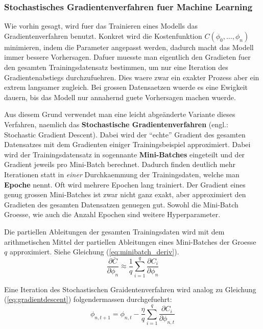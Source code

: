 \documentclass[../main]{subfiles}
\begin{document}
\subsubsection{Stochastisches Gradientenverfahren fuer Machine Learning}
Wie vorhin gesagt, wird fuer das Trainieren eines Modells das Gradientenverfahren benutzt.
Konkret wird die Kostenfunktion $C(\phi_0,\ldots,\phi_n)$ minimieren, indem die Parameter angepasst werden, dadurch macht das Modell immer bessere Vorhersagen.
Dafuer muesste man eigentlich den Gradieten fuer den gesamten Trainingsdatensatz bestimmen, um nur eine Iteration des Gradientenabstiegs durchzufuehren.
Dies waere zwar ein exakter Prozess aber ein extrem langsamer zugleich.
Bei grossen Datensaetzen wuerde es eine Ewigkeit dauern, bis das Modell nur annahernd guete Vorhersagen machen wuerde.
\par\medskip
Aus diesem Grund verwendet man eine leicht abgeänderte Variante dieses Verfahren, naemlich das \textbf{Stochastische Gradientenverfahren} (engl.: Stochastic Gradient Descent).
Dabei wird der ``echte'' Gradient des gesamten Datensatzes mit dem Gradienten einiger Trainingsbeispiel approximiert.
Dabei wird der Trainingsdatensatz in sogennante \textbf{Mini-Batches} eingeteilt und der Gradient jeweils pro Mini-Batch berechnet.
Dadurch finden deutlich mehr Iterationen statt in \textit{einer} Durchkaemmung der Trainingsdaten, welche man \textbf{Epoche} nennt. Oft wird mehrere Epochen lang trainiert.
Der Gradient eines genug grossen Mini-Batches ist zwar nicht ganz exakt, aber approximiert den Gradieten des gesamten Datensatzen genuegen gut.
Sowohl die Mini-Batch Groesse, wie auch die Anzahl Epochen sind weitere Hyperparameter.
\par\medskip
Die partiellen Ableitungen der gesamten Trainingsdaten wird mit dem arithmetischen Mittel der partiellen Ableitungen eines Mini-Batches der Groesse $q$ approximiert. Siehe Gleichung (\ref{eq:minibatch_deriv}).
\begin{equation}\label{eq:minibatch_deriv}
  \frac{\partial\bar{C}}{\partial\phi_n} \approx \frac{1}{q}\sum_{i=1}^{q} \frac{\partial C_i}{\partial\phi_n}
\end{equation}

Eine Iteration des Stochastischen Graidentenverfahren wird analog zu Gleichung (\ref{eq:gradientdescent}) folgendermassen durchgefuehrt:
\begin{equation}\label{eq:sgd}
  \phi_{n,t+1} = \phi_{n,t} - \frac{\eta}{q} \sum_{i=1}^{q} \frac{\partial C_i}{\partial \phi_{n,t}}
\end{equation}
\end{document}
